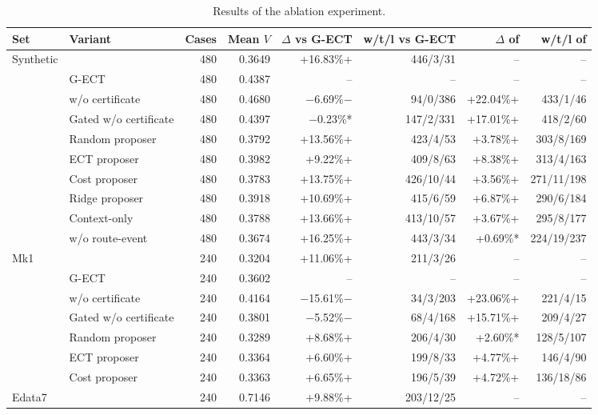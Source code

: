 \begin{table}
\centering
\begin{threeparttable}
\caption{Results of the ablation experiment.}
\label{tab:v9-ablation}
\footnotesize
\setlength{\tabcolsep}{4pt}
\begin{tabular*}{\textwidth}{@{\extracolsep{\fill}}llrrrrrr@{}}
\toprule
Set & Variant & Cases & Mean $V$ & $\Delta$ vs G-ECT & w/t/l vs G-ECT & $\Delta$ of \pgnd{} & w/t/l of \pgnd{} \\
\midrule
Synthetic & \pgnd{} & 480 & 0.3649 & +16.83\%+ & 446/3/31 & -- & -- \\
 & G-ECT & 480 & 0.4387 & -- & -- & -- & -- \\
 & w/o certificate & 480 & 0.4680 & $-$6.69\%$-$ & 94/0/386 & +22.04\%+ & 433/1/46 \\
 & Gated w/o certificate & 480 & 0.4397 & $-$0.23\%* & 147/2/331 & +17.01\%+ & 418/2/60 \\
 & Random proposer & 480 & 0.3792 & +13.56\%+ & 423/4/53 & +3.78\%+ & 303/8/169 \\
 & ECT proposer & 480 & 0.3982 & +9.22\%+ & 409/8/63 & +8.38\%+ & 313/4/163 \\
 & Cost proposer & 480 & 0.3783 & +13.75\%+ & 426/10/44 & +3.56\%+ & 271/11/198 \\
 & Ridge proposer & 480 & 0.3918 & +10.69\%+ & 415/6/59 & +6.87\%+ & 290/6/184 \\
 & Context-only & 480 & 0.3788 & +13.66\%+ & 413/10/57 & +3.67\%+ & 295/8/177 \\
 & w/o route-event & 480 & 0.3674 & +16.25\%+ & 443/3/34 & +0.69\%* & 224/19/237 \\
\midrule
Mk1 & \pgnd{} & 240 & 0.3204 & +11.06\%+ & 211/3/26 & -- & -- \\
 & G-ECT & 240 & 0.3602 & -- & -- & -- & -- \\
 & w/o certificate & 240 & 0.4164 & $-$15.61\%$-$ & 34/3/203 & +23.06\%+ & 221/4/15 \\
 & Gated w/o certificate & 240 & 0.3801 & $-$5.52\%$-$ & 68/4/168 & +15.71\%+ & 209/4/27 \\
 & Random proposer & 240 & 0.3289 & +8.68\%+ & 206/4/30 & +2.60\%* & 128/5/107 \\
 & ECT proposer & 240 & 0.3364 & +6.60\%+ & 199/8/33 & +4.77\%+ & 146/4/90 \\
 & Cost proposer & 240 & 0.3363 & +6.65\%+ & 196/5/39 & +4.72\%+ & 136/18/86 \\
\midrule
Edata7 & \pgnd{} & 240 & 0.7146 & +9.88\%+ & 203/12/25 & -- & -- \\

\end{tabular*}
\end{threeparttable}
\end{table}
